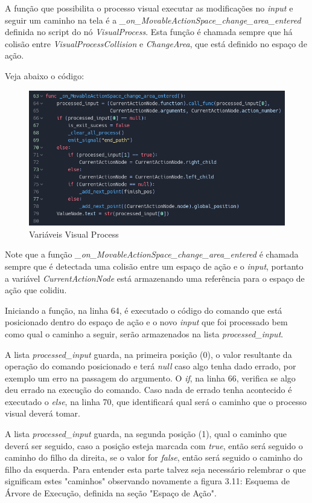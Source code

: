 A função que possibilita o processo visual executar as modificações no 
\textit{input} e seguir um caminho na tela é a
\textit{\_on\_MovableActionSpace\_change\_area\_entered} definida no script do
nó \textit{VisualProcess}. Esta função é chamada sempre que há colisão entre 
\textit{VisualProcessCollision} e \textit{ChangeArea}, que está definido no 
espaço de ação.

Veja abaixo o código:

\begin{figure}[H]
    \includegraphics[scale=0.7]{../figuras/codigo_MovableActionSpace_area_entered.png}
    \caption{Variáveis Visual Process}
\end{figure}

Note que a função \textit{\_on\_MovableActionSpace\_change\_area\_entered} é 
chamada sempre que é detectada uma colisão entre um espaço de ação e o 
\textit{input}, portanto a variável \textit{CurrentActionNode} está armazenando
uma referência para o espaço de ação que colidiu.

Iniciando a função, na linha 64,
é executado o código do comando que está posicionado dentro do espaço de ação
e o novo \textit{input} que foi processado bem como qual o caminho a seguir,
serão armazenados na lista \textit{processed\_input}.

A lista \textit{processed\_input} guarda, na primeira posição (0), o valor 
resultante da operação do comando posicionado e terá \textit{null} caso algo
tenha dado errado, por exemplo um erro na passagem do argumento. O \textit{if},
na linha 66, verifica se algo deu errado na execução do comando. Caso nada
de errado tenha acontecido é executado o \textit{else}, na linha 70, que
identificará qual será o caminho que o processo visual deverá tomar.

A lista \textit{processed\_input} guarda, na segunda posição (1), qual o
caminho que deverá ser seguido, caso a posição esteja marcada com \textit{true},
então será seguido o caminho do filho da direita, se o valor for \textit{false},
então será seguido o caminho do filho da esquerda. Para entender esta parte
talvez seja necessário relembrar o que significam estes "caminhos" observando 
novamente a figura 3.11: Esquema de Árvore de Execução, definida na seção 
"Espaço de Ação".

